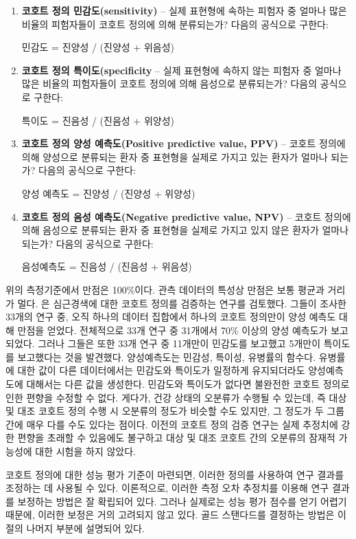 \documentclass[11pt]{book}
\theoremstyle{definition}
\theoremstyle{definition}
\theoremstyle{definition}
\theoremstyle{remark}
\begin{document}
\begin{enumerate}
\def\labelenumi{\arabic{enumi}.}
\item
  \textbf{코호트 정의 민감도(sensitivity)} -- 실제 표현형에 속하는
  피험자 중 얼마나 많은 비율의 피험자들이 코호트 정의에 의해 분류되는가?
  다음의 공식으로 구한다:

  민감도 = 진양성 / (진양성 + 위음성)
\item
  \textbf{코호트 정의 특이도(specificity} -- 실제 표현형에 속하지 않는
  피험자 중 얼마나 많은 비율의 피험자들이 코호트 정의에 의해 음성으로
  분류되는가? 다음의 공식으로 구한다:

  특이도 = 진음성 / (진음성 + 위양성)
\item
  \textbf{코호트 정의 양성 예측도(Positive predictive value, PPV)} --
  코호트 정의에 의해 양성으로 분류되는 환자 중 표현형을 실제로 가지고
  있는 환자가 얼마나 되는가? 다음의 공식으로 구한다:

  양성 예측도 = 진양성 / (진양성 + 위양성)
\item
  \textbf{코호트 정의 음성 예측도(Negative predictive value, NPV)} --
  코호트 정의에 의해 음성으로 분류되는 환자 중 표현형을 실제로 가지고
  있지 않은 환자가 얼마나 되는가? 다음의 공식으로 구한다:

  음성예측도 = 진음성 / (진음성 + 위음성)
\end{enumerate}

위의 측정기준에서 만점은 100\%이다. 관측 데이터의 특성상 만점은 보통
평균과 거리가 멀다. \citet{Rubbo2015phenotypes} 은 심근경색에 대한
코호트 정의를 검증하는 연구를 검토했다. 그들이 조사한 33개의 연구 중,
오직 하나의 데이터 집합에서 하나의 코호트 정의만이 양성 예측도 대해
만점을 얻었다. 전체적으로 33개 연구 중 31개에서 70\% 이상의 양성
예측도가 보고되었다. 그러나 그들은 또한 33개 연구 중 11개만이 민감도를
보고했고 5개만이 특이도를 보고했다는 것을 발견했다. 양성예측도는 민감성,
특이성, 유병률의 함수다. 유병률에 대한 값이 다른 데이터에서는 민감도와
특이도가 일정하게 유지되더라도 양성예측도에 대해서는 다른 값을 생성한다.
민감도와 특이도가 없다면 불완전한 코호트 정의로 인한 편향을 수정할 수
없다. 게다가, 건강 상태의 오분류가 수행될 수 있는데, 즉 대상 및 대조
코호트 정의 수행 시 오분류의 정도가 비슷할 수도 있지만, 그 정도가 두
그룹 간에 매우 다를 수도 있다는 점이다. 이전의 코호트 정의 검증 연구는
실제 추정치에 강한 편향을 초래할 수 있음에도 불구하고 대상 및 대조
코호트 간의 오분류의 잠재적 가능성에 대한 시험을 하지 않았다.

코호트 정의에 대한 성능 평가 기준이 마련되면, 이러한 정의를 사용하여
연구 결과를 조정하는 데 사용될 수 있다. 이론적으로, 이러한 측정 오차
추정치를 이용해 연구 결과를 보정하는 방법은 잘 확립되어 있다. 그러나
실제로는 성능 평가 점수를 얻기 어렵기 때문에, 이러한 보정은 거의
고려되지 않고 있다. 골드 스탠다드를 결정하는 방법은 이 절의 나머지
부분에 설명되어 있다.
\end{document}

